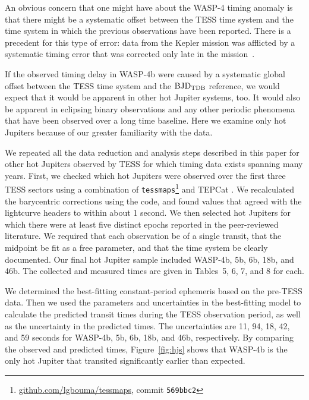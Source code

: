 \documentclass[12pt,twocolumn,tighten]{aastex62}
\begin{document}
An obvious concern that one might have about the WASP-4
timing anomaly is that there might be a systematic offset between the
TESS time system and the time system in which the previous
observations have been reported.  There is a precedent for this type
of error: data from the Kepler mission was afflicted by a systematic
timing error that was corrected only late in the
mission~\citep[][Section 3.4]{kepler_DR19_2013}.

If the observed timing delay in WASP-4b were caused by a systematic
global offset between the TESS time system and the ${\rm BJD}_{\rm
TDB}$ reference, we would expect that it would be apparent in other
hot Jupiter systems, too. It would also be apparent in eclipsing
binary observations and any other periodic phenomena that have been
observed over a long time baseline. Here we examine only hot Jupiters
because of our greater familiarity with the data.

We repeated all the data reduction and analysis steps described in
this paper for other hot Jupiters observed by TESS for which timing
data exists spanning many years.  First, we checked which hot Jupiters
were observed over the first three TESS sectors using a combination of
\texttt{tessmaps}\footnote{\url{github.com/lgbouma/tessmaps}, 
	commit \texttt{569bbc2}} and
TEPCat \citep{southworth_homogeneous_2011}.  We recalculated the
barycentric corrections using the \citet{eastman_achieving_2010} code,
and found values that agreed with the lightcurve headers to within
about 1 second.  We then selected hot Jupiters for which there were at
least five distinct epochs reported in the peer-reviewed literature.
We required that each observation be of a single transit, that the
midpoint be fit as a free parameter, and that the time system be
clearly documented.  Our final hot Jupiter sample included WASP-4b,
5b, 6b, 18b, and 46b.  The collected and measured times are given in
Tables~5, 6, 7, and 8 for each.

We determined the best-fitting constant-period ephemeris based on the
pre-TESS data. Then we used the parameters and uncertainties in the
best-fitting model to calculate the predicted transit times during
the TESS observation period, as well as the uncertainty in the
predicted times.  The uncertainties are 11, 94, 18, 42, and 59 seconds
for WASP-4b, 5b, 6b, 18b, and 46b, respectively.  By comparing the
observed and predicted times, Figure~\ref{fig:hjs} shows that WASP-4b
is the only hot Jupiter that transited significantly earlier than
expected.
\end{document}
